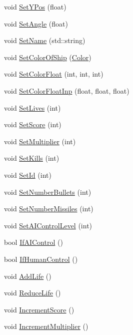 \begin{DoxyCompactItemize}
\item 
void \hyperlink{classShip_a5d46b07cad9b73ae02fee947a0906f7c}{Set\-Y\-Pos} (float)
\item 
void \hyperlink{classShip_acb0b042f4f9d1dc34531b86ae30ed837}{Set\-Angle} (float)
\item 
void \hyperlink{classShip_a48f127705d9da6d35d6e4428ec5e4f04}{Set\-Name} (std\-::string)
\item 
void \hyperlink{classShip_ad475785ec2b62e6526a399dc3d310634}{Set\-Color\-Of\-Ship} (\hyperlink{classColor}{Color})
\item 
void \hyperlink{classShip_ade5817ead599ccfa01b85e236f30a41b}{Set\-Color\-Float} (int, int, int)
\item 
void \hyperlink{classShip_a0c42eb1e45d5d59dcbe0b58709a000ba}{Set\-Color\-Float\-Inp} (float, float, float)
\item 
void \hyperlink{classShip_a0ebcfd4b2e8c9ca8923e3aa801fc2217}{Set\-Lives} (int)
\item 
void \hyperlink{classShip_a165714274abcab7237b762b952b13921}{Set\-Score} (int)
\item 
void \hyperlink{classShip_ac223ae51ffc65f72bb4c38459bf93caa}{Set\-Multiplier} (int)
\item 
void \hyperlink{classShip_a3bfb9175373b3364c39196a361601920}{Set\-Kills} (int)
\item 
void \hyperlink{classShip_a6c08f99d213ac1d97fd17801fd71a257}{Set\-Id} (int)
\item 
void \hyperlink{classShip_a9f14d0fade35ea2a3e86da3080501372}{Set\-Number\-Bullets} (int)
\item 
void \hyperlink{classShip_a4f9e8ec89d02f46688deec59c0222aa2}{Set\-Number\-Missiles} (int)
\item 
void \hyperlink{classShip_ac15c5a25a8ab9477aa9a1620fd95de15}{Set\-A\-I\-Control\-Level} (int)
\item 
bool \hyperlink{classShip_a35c42bebd005d25c7e719f06eb35e0ac}{If\-A\-I\-Control} ()
\item 
bool \hyperlink{classShip_a18877582a0ed12a66eb76ab2c4728aa4}{If\-Human\-Control} ()
\item 
void \hyperlink{classShip_aea08522dbb68429445f87c07fbee3cbf}{Add\-Life} ()
\item 
void \hyperlink{classShip_af0084ae20ec33e01bfbd5167d0972eae}{Reduce\-Life} ()
\item 
void \hyperlink{classShip_a782d74acb647734863c446dae2071dbf}{Increment\-Score} ()
\item 
void \hyperlink{classShip_a7bfdee46045d9ee5e63d52ac32c04d83}{Increment\-Multiplier} ()

\end{DoxyCompactItemize}
